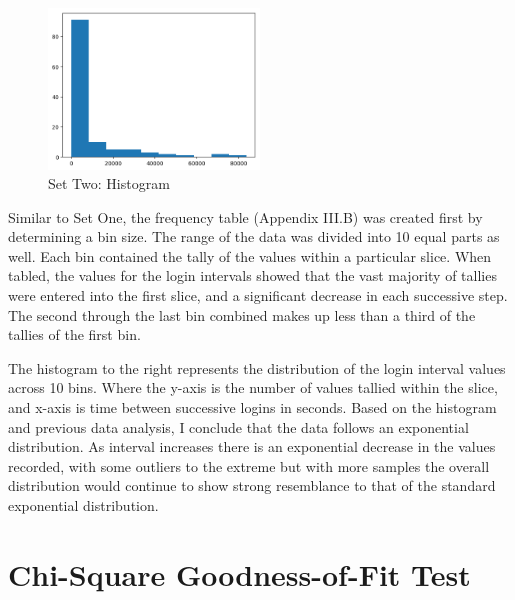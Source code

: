 \documentclass[10pt]{report}
\begin{document}
\begin{figure}
	\centering
	\includegraphics[width=0.50\textwidth]{results/logininterval_histogram}
	\caption{Set Two: Histogram}
\end{figure}

Similar to Set One, the frequency table (Appendix III.B) was created first by determining a bin size. The range of the data was
divided into 10 equal parts as well. Each bin contained the tally of the values within a particular slice.
When tabled, the values for the login intervals showed that the vast majority
of tallies were entered into the first slice, and a significant decrease in each successive step. The second
through the last bin combined makes up less than a third of the tallies of the first bin.


The histogram to the right represents the distribution of the login interval values across 10 bins.
Where the y-axis is the number of values tallied within the slice, and x-axis is time between successive logins
in seconds.
Based on the histogram and previous data analysis, I conclude that the data follows an exponential distribution. As
interval increases there is an exponential decrease in the values recorded, with some outliers to the extreme but 
with more samples the overall distribution would continue to show strong resemblance to that of the standard
exponential distribution.

\newpage
\section*{Chi-Square Goodness-of-Fit Test}
\end{document}
